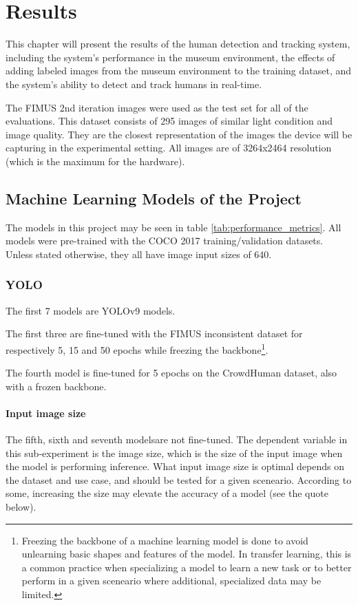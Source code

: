 \section{Results}
\label{sec:results}
This chapter will present the results of the human detection and tracking system, including the system's performance in the museum environment, the effects of adding labeled images from the museum environment to the training dataset, and the system's ability to detect and track humans in real-time.

The FIMUS 2nd iteration images were used as the test set for all of the evaluations. This dataset consists of 295 images of similar light condition and image quality. They are the closest representation of the images the device will be capturing in the experimental setting. All images are of 3264x2464 resolution (which is the maximum for the hardware).

\subsection{Machine Learning Models of the Project}
The models in this project may be seen in table \ref{tab:performance_metrics}. All models were pre-trained with the COCO 2017 training/validation datasets. Unless stated otherwise, they all have image input sizes of 640. 

\subsubsection{YOLO}
The first 7 models are YOLOv9 models. 

The first three are fine-tuned with the FIMUS inconsistent dataset for respectively 5, 15 and 50 epochs while freezing the backbone\footnote{Freezing the backbone of a machine learning model is done to avoid unlearning basic shapes and features of the model. In transfer learning, this is a common practice when specializing a model to learn a new task or to better perform in a given sceneario where additional, specialized data may be limited.}. 

The fourth model is fine-tuned for 5 epochs on the CrowdHuman dataset, also with a frozen backbone. 

\paragraph{Input image size}
The fifth, sixth and seventh modelsare not fine-tuned. The dependent variable in this sub-experiment is the image size, which is the size of the input image when the model is performing inference. What input image size is optimal depends on the dataset and use case, and should be tested for a given sceneario. According to some, increasing the size may elevate the accuracy of a model (see the quote below). 


